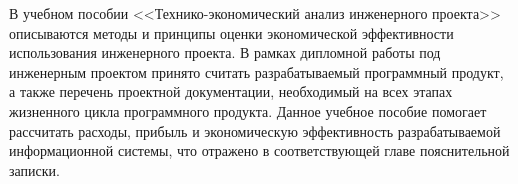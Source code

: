 В учебном пособии <<Технико-экономический анализ инженерного проекта>> описываются методы и принципы оценки экономической эффективности использования инженерного проекта.
В рамках дипломной работы под инженерным проектом принято считать разрабатываемый программный продукт, а также перечень проектной документации, необходимый на всех этапах жизненного цикла программного продукта.
Данное учебное пособие помогает рассчитать расходы, прибыль и экономическую эффективность разрабатываемой информационной системы, что отражено в соответствующей главе пояснительной записки.

\clearpage
\newpage